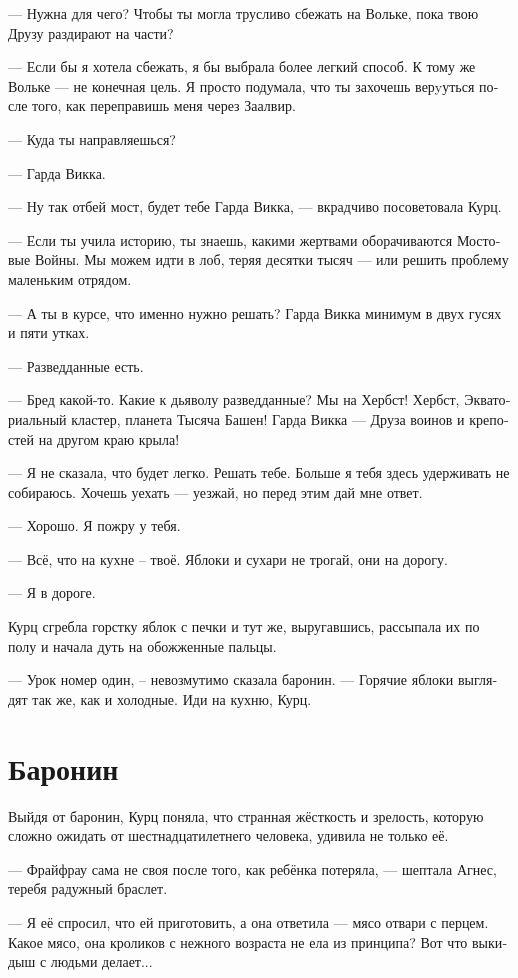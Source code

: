 \documentclass[a4paper,12pt,fleqn]{book}\usepackage{cooltooltips}\usepackage{polyglossia}\setdefaultlanguage[babelshorthands=true]{russian}\setotherlanguage{english}\defaultfontfeatures{Ligatures=TeX,Mapping=tex-text} \usepackage{xcolor}\definecolor{lightgray}{HTML}{bbbbbb}\color{lightgray}\newcommand{\ml}[3]{\textenglish{\textcolor{black}{#3}}}
\begin{document}
--- Нужна для чего?
Чтобы ты могла трусливо сбежать на Вольке, пока твою Друзу раздирают на части?

--- Если бы я хотела сбежать, я бы выбрала более легкий способ.
К тому же Вольке --- не конечная цель.
Я просто подумала, что ты захочешь верyуться после того, как переправишь меня через Заалвир.

--- Куда ты направляешься?

--- Гарда Викка.

--- Ну так отбей мост, будет тебе Гарда Викка, --- вкрадчиво посоветовала Курц.

--- Если ты учила историю, ты знаешь, какими жертвами оборачиваются Мостовые Войны.
Мы можем идти в лоб, теряя десятки тысяч --- или решить проблему маленьким отрядом.

--- А ты в курсе, что именно нужно решать?
Гарда Викка минимум в двух гусях и пяти утках.

--- Разведданные есть.

--- Бред какой-то.
Какие к дьяволу разведданные?
Мы на Хербст!
Хербст, Экваториальный кластер, планета Тысяча Башен!
Гарда Викка --- Друза воинов и крепостей на другом краю крыла!

--- Я не сказала, что будет легко.
Решать тебе.
Больше я тебя здесь удерживать не собираюсь.
Хочешь уехать --- уезжай, но перед этим дай мне ответ.

--- Хорошо.
Я пожру у тебя.

--- Всё, что на кухне -- твоё.
Яблоки и сухари не трогай, они на дорогу.

--- Я в дороге.

Курц сгребла горстку яблок с печки и тут же, выругавшись, рассыпала их по полу и начала дуть на обожженные пальцы.

--- Урок номер один, -- невозмутимо сказала баронин.
--- Горячие яблоки выглядят так же, как и холодные.
Иди на кухню, Курц.

\section{Баронин}

Выйдя от баронин, Курц поняла, что странная жёсткость и зрелость, которую сложно ожидать от шестнадцатилетнего человека, удивила не только её.

--- Фрайфрау сама не своя после того, как ребёнка потеряла, --- шептала Агнес, теребя радужный браслет.

--- Я её спросил, что ей приготовить, а она ответила --- мясо отвари с перцем.
Какое мясо, она кроликов с нежного возраста не ела из принципа?
Вот что выкидыш с людьми делает...
\end{document}
